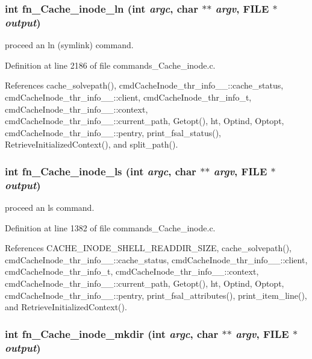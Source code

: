 \subsubsection{\setlength{\rightskip}{0pt plus 5cm}int fn\_\-Cache\_\-inode\_\-ln (int {\em argc}, char $\ast$$\ast$ {\em argv}, FILE $\ast$ {\em output})}\label{commands__Cache__inode_8c_a37}


proceed an ln (symlink) command. 

Definition at line 2186 of file commands\_\-Cache\_\-inode.c.

References cache\_\-solvepath(), cmd\-Cache\-Inode\_\-thr\_\-info\_\-\_\-::cache\_\-status, cmd\-Cache\-Inode\_\-thr\_\-info\_\-\_\-::client, cmd\-Cache\-Inode\_\-thr\_\-info\_\-t, cmd\-Cache\-Inode\_\-thr\_\-info\_\-\_\-::context, cmd\-Cache\-Inode\_\-thr\_\-info\_\-\_\-::current\_\-path, Getopt(), ht, Optind, Optopt, cmd\-Cache\-Inode\_\-thr\_\-info\_\-\_\-::pentry, print\_\-fsal\_\-status(), Retrieve\-Initialized\-Context(), and split\_\-path().
\subsubsection{\setlength{\rightskip}{0pt plus 5cm}int fn\_\-Cache\_\-inode\_\-ls (int {\em argc}, char $\ast$$\ast$ {\em argv}, FILE $\ast$ {\em output})}\label{commands__Cache__inode_8c_a33}


proceed an ls command. 

Definition at line 1382 of file commands\_\-Cache\_\-inode.c.

References CACHE\_\-INODE\_\-SHELL\_\-READDIR\_\-SIZE, cache\_\-solvepath(), cmd\-Cache\-Inode\_\-thr\_\-info\_\-\_\-::cache\_\-status, cmd\-Cache\-Inode\_\-thr\_\-info\_\-\_\-::client, cmd\-Cache\-Inode\_\-thr\_\-info\_\-t, cmd\-Cache\-Inode\_\-thr\_\-info\_\-\_\-::context, cmd\-Cache\-Inode\_\-thr\_\-info\_\-\_\-::current\_\-path, Getopt(), ht, Optind, Optopt, cmd\-Cache\-Inode\_\-thr\_\-info\_\-\_\-::pentry, print\_\-fsal\_\-attributes(), print\_\-item\_\-line(), and Retrieve\-Initialized\-Context().
\subsubsection{\setlength{\rightskip}{0pt plus 5cm}int fn\_\-Cache\_\-inode\_\-mkdir (int {\em argc}, char $\ast$$\ast$ {\em argv}, FILE $\ast$ {\em output})}\label{commands__Cache__inode_8c_a35}


